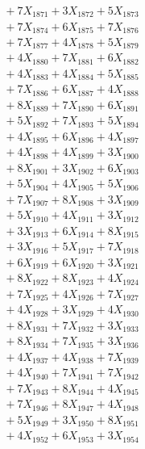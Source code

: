 \documentclass[a4paper,10pt]{article}
\begin{document}
{\begin{align}
&\;  + 7 X_{1871} + 3 X_{1872} + 5 X_{1873} \\[0.3ex]
&\;  + 7 X_{1874} + 6 X_{1875} + 7 X_{1876} \\[0.3ex]
&\;  + 7 X_{1877} + 4 X_{1878} + 5 X_{1879} \\[0.3ex]
&\;  + 4 X_{1880} + 7 X_{1881} + 6 X_{1882} \\[0.3ex]
&\;  + 4 X_{1883} + 4 X_{1884} + 5 X_{1885} \\[0.3ex]
&\;  + 7 X_{1886} + 6 X_{1887} + 4 X_{1888} \\[0.3ex]
&\;  + 8 X_{1889} + 7 X_{1890} + 6 X_{1891} \\[0.3ex]
&\;  + 5 X_{1892} + 7 X_{1893} + 5 X_{1894} \\[0.3ex]
&\;  + 4 X_{1895} + 6 X_{1896} + 4 X_{1897} \\[0.3ex]
&\;  + 4 X_{1898} + 4 X_{1899} + 3 X_{1900} \\[0.5ex]\allowbreak
&\;  + 8 X_{1901} + 3 X_{1902} + 6 X_{1903} \\[0.3ex]
&\;  + 5 X_{1904} + 4 X_{1905} + 5 X_{1906} \\[0.3ex]
&\;  + 7 X_{1907} + 8 X_{1908} + 3 X_{1909} \\[0.3ex]
&\;  + 5 X_{1910} + 4 X_{1911} + 3 X_{1912} \\[0.3ex]
&\;  + 3 X_{1913} + 6 X_{1914} + 8 X_{1915} \\[0.3ex]
&\;  + 3 X_{1916} + 5 X_{1917} + 7 X_{1918} \\[0.3ex]
&\;  + 6 X_{1919} + 6 X_{1920} + 3 X_{1921} \\[0.3ex]
&\;  + 8 X_{1922} + 8 X_{1923} + 4 X_{1924} \\[0.3ex]
&\;  + 7 X_{1925} + 4 X_{1926} + 7 X_{1927} \\[0.3ex]
&\;  + 4 X_{1928} + 3 X_{1929} + 4 X_{1930} \\[0.5ex]\allowbreak
&\;  + 8 X_{1931} + 7 X_{1932} + 3 X_{1933} \\[0.3ex]
&\;  + 8 X_{1934} + 7 X_{1935} + 3 X_{1936} \\[0.3ex]
&\;  + 4 X_{1937} + 4 X_{1938} + 7 X_{1939} \\[0.3ex]
&\;  + 4 X_{1940} + 7 X_{1941} + 7 X_{1942} \\[0.3ex]
&\;  + 7 X_{1943} + 8 X_{1944} + 4 X_{1945} \\[0.3ex]
&\;  + 7 X_{1946} + 8 X_{1947} + 4 X_{1948} \\[0.3ex]
&\;  + 5 X_{1949} + 3 X_{1950} + 8 X_{1951} \\[0.3ex]
&\;  + 4 X_{1952} + 6 X_{1953} + 3 X_{1954} \\[0.3ex]

\end{align}}
\end{document}
